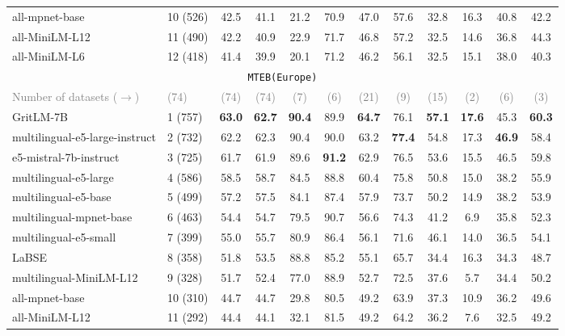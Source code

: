 \begin{table*}[!th]
{{\begin{tabular}{llcc|cccccccc}
all-mpnet-base & 10 (526) & 42.5 & 41.1 & 21.2 & 70.9 & 47.0 & 57.6 & 32.8 & 16.3 & 40.8 & 42.2 \\
all-MiniLM-L12 & 11 (490) & 42.2 & 40.9 & 22.9 & 71.7 & 46.8 & 57.2 & 32.5 & 14.6 & 36.8 & 44.3 \\
all-MiniLM-L6 & 12 (418) & 41.4 & 39.9 & 20.1 & 71.2 & 46.2 & 56.1 & 32.5 & 15.1 & 38.0 & 40.3 \\
\midrule
\multicolumn{12}{c}{\vspace{2mm} \normalsize \texttt{MTEB(Europe)}} \\
\textcolor{gray}{Number of datasets ($\rightarrow$) } & \textcolor{gray}{(74)} & \textcolor{gray}{(74)} & \multicolumn{1}{c}{\textcolor{gray}{(74)}} &   \multicolumn{1}{c}{\textcolor{gray}{(7)}} &   \textcolor{gray}{(6)}  &   \textcolor{gray}{(21)}   &   \textcolor{gray}{(9)}  &   \textcolor{gray}{(15)} &   \textcolor{gray}{(2)}  &   \textcolor{gray}{(6)} &   \textcolor{gray}{(3)}  \\
\midrule
GritLM-7B & 1 (757) & \textbf{63.0} & \textbf{62.7} & \textbf{90.4} & 89.9 & \textbf{64.7} & 76.1 & \textbf{57.1} & \textbf{17.6} & 45.3 & \textbf{60.3} \\
multilingual-e5-large-instruct & 2 (732) & 62.2 & 62.3 & 90.4 & 90.0 & 63.2 & \textbf{77.4} & 54.8 & 17.3 & \textbf{46.9} & 58.4 \\
e5-mistral-7b-instruct & 3 (725) & 61.7 & 61.9 & 89.6 & \textbf{91.2} & 62.9 &  76.5 & 53.6 & 15.5 & 46.5 & 59.8 \\
multilingual-e5-large & 4 (586) & 58.5 & 58.7 & 84.5 & 88.8 & 60.4 & 75.8 & 50.8 & 15.0 & 38.2 & 55.9 \\
multilingual-e5-base & 5 (499) & 57.2 & 57.5 & 84.1 & 87.4 & 57.9 & 73.7 & 50.2 & 14.9 & 38.2 & 53.9 \\
multilingual-mpnet-base & 6 (463) & 54.4 & 54.7 & 79.5 & 90.7 & 56.6 & 74.3 & 41.2 & 6.9 & 35.8 & 52.3 \\
multilingual-e5-small & 7 (399) & 55.0 & 55.7 & 80.9 & 86.4 & 56.1 & 71.6 & 46.1 & 14.0 & 36.5 & 54.1 \\
LaBSE & 8 (358) & 51.8 & 53.5 & 88.8 & 85.2 & 55.1 & 65.7 & 34.4 & 16.3 & 34.3 & 48.7 \\
multilingual-MiniLM-L12 & 9 (328) & 51.7 & 52.4 & 77.0 & 88.9 & 52.7 & 72.5 & 37.6 & 5.7 & 34.4 & 50.2 \\
all-mpnet-base & 10 (310) & 44.7 & 44.7 & 29.8 & 80.5 & 49.2 & 63.9 & 37.3 & 10.9 & 36.2 & 49.6 \\
all-MiniLM-L12 & 11 (292) & 44.4 & 44.1 & 32.1 & 81.5 & 49.2 & 64.2 & 36.2 & 7.6 & 32.5 & 49.2 \\

\end{tabular}}}
\end{table*}
